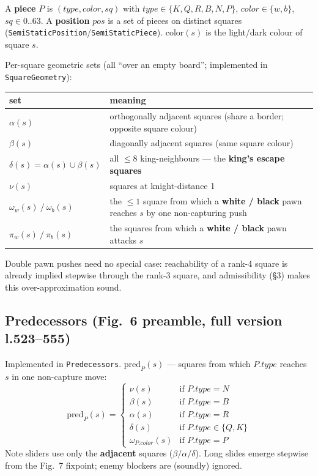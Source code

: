 \documentclass[11pt]{article}
\newcommand{\code}[1]{\texttt{#1}}
\theoremstyle{plain}
\theoremstyle{definition}
\newcommand{\pos}{\mathit{pos}}
\newcommand{\sq}{\mathit{sq}}
\newcommand{\predP}{\mathrm{pred}_P}
\begin{document}
A \textbf{piece} $P$ is $(\mathit{type}, \mathit{color}, \sq)$ with $\mathit{type} \in \{K,Q,R,B,N,P\}$,
$\mathit{color} \in \{w,b\}$, $\sq \in 0..63$. A \textbf{position} $\pos$ is a set of pieces on distinct squares
(\code{SemiStaticPosition}/\code{SemiStaticPiece}). $\mathrm{color}(s)$ is the light/dark colour of square $s$.

Per-square geometric sets (all ``over an empty board''; implemented in \code{SquareGeometry}):

\begin{center}
\begin{tabular}{@{}l p{11.2cm}@{}}
\toprule
set & meaning \\
\midrule
$\alpha(s)$ & orthogonally adjacent squares (share a border; opposite square colour) \\
$\beta(s)$ & diagonally adjacent squares (same square colour) \\
$\delta(s) = \alpha(s) \cup \beta(s)$ & all $\le 8$ king-neighbours --- the \textbf{king's escape squares} \\
$\nu(s)$ & squares at knight-distance 1 \\
$\omega_w(s)\ /\ \omega_b(s)$ & the $\le 1$ square from which a \textbf{white / black} pawn reaches $s$ by one non-capturing push \\
$\pi_w(s)\ /\ \pi_b(s)$ & the squares from which a \textbf{white / black} pawn attacks $s$ \\
\bottomrule
\end{tabular}
\end{center}

\noindent Double pawn pushes need no special case: reachability of a rank-4 square is already implied stepwise
through the rank-3 square, and admissibility (\S3) makes this over-approximation sound.

\subsection{Predecessors (Fig.~6 preamble, full version l.523--555)}

Implemented in \code{Predecessors}. $\predP(s)$ --- squares from which $P.\mathit{type}$ reaches $s$ in one
non-capture move:
\[
  \predP(s) =
  \begin{cases}
    \nu(s) & \text{if } P.\mathit{type} = N \\
    \beta(s) & \text{if } P.\mathit{type} = B \\
    \alpha(s) & \text{if } P.\mathit{type} = R \\
    \delta(s) & \text{if } P.\mathit{type} \in \{Q,K\} \\
    \omega_{P.\mathit{color}}(s) & \text{if } P.\mathit{type} = P
  \end{cases}
\]
Note sliders use only the \textbf{adjacent} squares ($\beta/\alpha/\delta$). Long slides emerge stepwise from the
Fig.~7 fixpoint; enemy blockers are (soundly) ignored.
\end{document}
